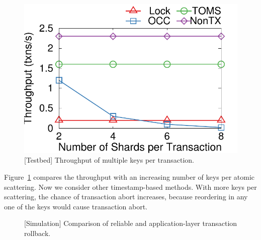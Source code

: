 

\begin{figure}[t]
\centering
\includegraphics[width=.35\textwidth]{gnuplot/multishard.pdf}
\caption{[Testbed] Throughput of multiple keys per transaction.}
\label{fig:multishard}
\vspace{-10pt}
\end{figure}

Figure~\ref{fig:multishard} compares the throughput with an increasing number of keys per atomic scattering. Now we consider other timestamp-based methods. With more keys per scattering, the chance of transaction abort increases, because reordering in any one of the keys would cause transaction abort.




\begin{figure}[t]
\centering
	\hspace{0.01\textwidth}
\caption{[Simulation] Comparison of reliable \sys and application-layer transaction rollback.}
\label{fig:ycsb-loss}
\end{figure}


